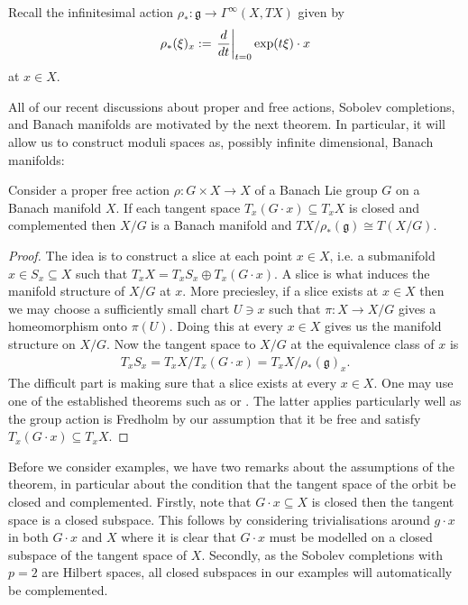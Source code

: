 \documentclass[12pt]{ociamthesis}  %
\begin{document}
Recall the infinitesimal action
$\rho_* : \mathfrak g \to \Gamma^\infty(X,TX)$ given by
\begin{align*}
  \rho_*(\xi)_x := \left.{\frac{d}{dt}}\right\vert_{t=0} \exp(t\xi)\cdot x
\end{align*}
at $x\in X$.

All of our recent discussions about proper and free actions, Sobolev
completions, and Banach manifolds are motivated by the next theorem.
In particular, it will allow us to construct moduli spaces as, possibly
infinite dimensional, Banach manifolds:

\begin{theorem}\label{thm:banach_quotient}
  Consider a proper free action $\rho : G\times X\to X$ of a Banach
  Lie group $G$ on a Banach manifold $X$. If each tangent space
  $T_x(G\cdot x) \subseteq T_x X$ is closed and complemented then
  $X/G$ is a Banach manifold and $TX/\rho_*(\mathfrak g) \cong T(X/G)$.
  \begin{proof}
    The idea is to construct a slice at each point $x\in X$, i.e. a submanifold
    $x\in S_x\subseteq X$ such that $T_x X = T_xS_x \oplus T_x(G\cdot x)$. A slice is
    what induces the manifold structure of $X/G$ at $x$. More preciesley, if a slice
    exists at $x\in X$ then we may choose a sufficiently small chart $U\ni x$
    such that $\pi : X \to X/G$ gives a homeomorphism onto $\pi(U)$. Doing this
    at every $x\in X$ gives us the manifold structure on $X/G$. Now the tangent space
    to $X/G$ at the equivalence class of $x$ is
    \begin{align}\label{eq:banach_quotient_tangent}
      T_x S_x = T_x X / T_x (G\cdot x) = T_x X/\rho_*(\mathfrak g)_x.
    \end{align}
    The difficult part is making sure that a slice exists at every $x\in X$. One may use
    one of the established theorems such as \cite[Theorem 3.28]{diez2019}
    or \cite[Theorem 5.2.6]{palais1992}. The latter applies particularly well
    as the group action is Fredholm by our assumption that it be free and satisfy
    $T_x(G\cdot x)\subseteq T_x X$.
  \end{proof}
\end{theorem}

Before we consider examples, we have two remarks about the assumptions of the theorem,
in particular about the condition that the tangent space of the orbit be closed and
complemented. Firstly, note that $G\cdot x \subseteq X$ is closed then the tangent
space is a closed subspace. This follows by considering trivialisations around $g\cdot x$
in both $G\cdot x$ and $X$ where it is clear that $G\cdot x$ must be modelled on a closed
subspace of the tangent space of $X$. Secondly, as the Sobolev completions with $p=2$ are
Hilbert spaces, all closed subspaces in our examples will automatically be complemented.
\end{document}
